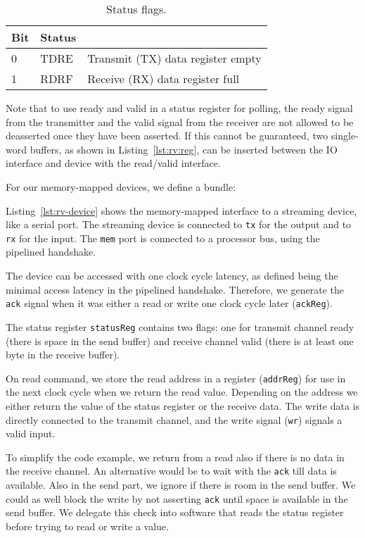 \documentclass[%
    10pt,
    headinclude, footexclude,
    openright, %
    notitlepage,
    cleardoubleempty,
    headsepline,
    pointlessnumbers,
    bibtotoc, idxtotoc,
    ]{scrbook}
\newcommand{\code}[1]{{\lstinline[basicstyle=\small\ttfamily]{#1}}}
\newcommand{\todo}[1]{{\emph{TODO: #1}}}
\renewcommand{\todo}[1]{}
\begin{document}
\begin{table}
\centering
\begin{tabular}{lll}
\toprule
Bit & Status & \\
\midrule
0 & TDRE & Transmit (TX) data register empty \\
1 & RDRF & Receive (RX) data register full \\
\bottomrule
\end{tabular}
\caption{Status flags.}
\label{tab:addr:uart:status}
\end{table}

Note that to use ready and valid in a status register for polling, the ready signal from
the transmitter and the valid signal from the receiver are not allowed to be deasserted
once they have been asserted. If this cannot be guaranteed, two single-word buffers,
as shown in Listing~\ref{lst:rv:reg}, can be inserted between the IO interface and
device with the read/valid interface.

\todo{Talk on what happens when reading from an empty device or writing to a full device.}

For our memory-mapped devices, we define a bundle:


Listing~\ref{lst:rv-device} shows the memory-mapped interface to a streaming
device, like a serial port. The streaming device is connected to \code{tx} for the output
and to \code{rx} for the input. The \code{mem} port is connected to a processor bus,
using the pipelined handshake.

The device can be accessed with one clock cycle latency, as defined being the minimal
access latency in the pipelined handshake. Therefore, we generate the \code{ack}
signal when it was either a read or write one clock cycle later (\code{ackReg}).

The status register \code{statusReg} contains two flags: one for transmit channel ready
(there is space in the send buffer) and receive channel valid (there is at least one byte
in the receive buffer).

On read command, we store the read address in a register (\code{addrReg})
for use in the next clock cycle when we return the read value. Depending on the address
we either return the value of the status register or the receive data.
The write data is directly connected to the transmit channel, and the write signal
(\code{wr}) signals a valid input.


To simplify the code example, we return from a read also if there is no data in the
receive channel. An alternative would be to wait with the \code{ack} till
data is available. Also in the send part, we ignore if there is room in the
send buffer. We could as well block the write by not asserting \code{ack}
until space is available in the send buffer.
We delegate this check into software that reads the status register before trying
to read or write a value.
\end{document}
